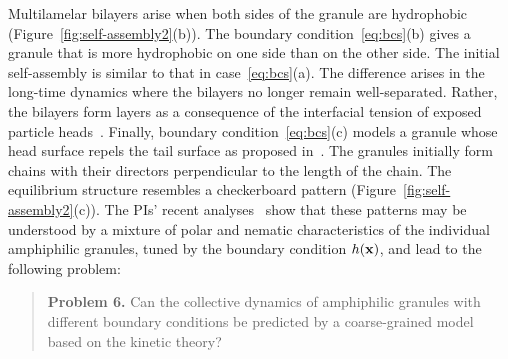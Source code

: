 Multilamelar bilayers arise when both sides of the granule are
hydrophobic (Figure~\ref{fig:self-assembly2}(b)). The boundary
condition~\eqref{eq:bcs}(b) gives a granule that is more hydrophobic on
one side than on the other side. The initial self-assembly is similar to
that in case~\eqref{eq:bcs}(a). The difference arises in the long-time
dynamics where the bilayers no longer remain well-separated. Rather, the
bilayers form layers as a consequence of the interfacial tension of
exposed particle heads~\cite{Huetal19, deMeetal21}. 
%
Finally, boundary condition~\eqref{eq:bcs}(c) models a granule whose
head surface repels the tail surface as proposed in~\cite{MaRa76, Ma77}.
The granules initially form chains with their directors perpendicular to
the length of the chain. The equilibrium structure resembles a
checkerboard pattern (Figure~\ref{fig:self-assembly2}(c)).
The PIs' recent analyses~\cite{fu-ryh-qua-you2022} show that these
patterns may be understood by a mixture of polar and nematic
characteristics of the individual amphiphilic granules, tuned by the
boundary condition $h({\mathbf{x}})$, and lead to the following problem:
%
\begin{quotation}
  \noindent
  \textbf{Problem 6.} Can the collective dynamics of amphiphilic granules with different boundary conditions 
be predicted by a coarse-grained model based on the kinetic theory?
\end{quotation}
%
